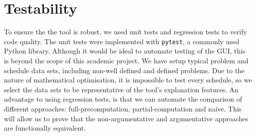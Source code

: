 \section{Testability}

To ensure the the tool is robust, we used unit tests and regression tests to verify code quality. The unit tests were implemented with \texttt{pytest}, a commonly used Python library. Although it would be ideal to automate testing of the GUI, this is beyond the scope of this academic project. We have setup typical problem and schedule data sets, including non-well defined and defined problems. Due to the nature of mathematical optimisation, it is impossible to test every schedule, so we select the data sets to be representative of the tool's explanation features. An advantage to using regression tests, is that we can automate the comparison of different approaches: full-precomputation, partial-computation and naive. This will allow us to prove that the non-argumentative and argumentative approaches are functionally equivalent.